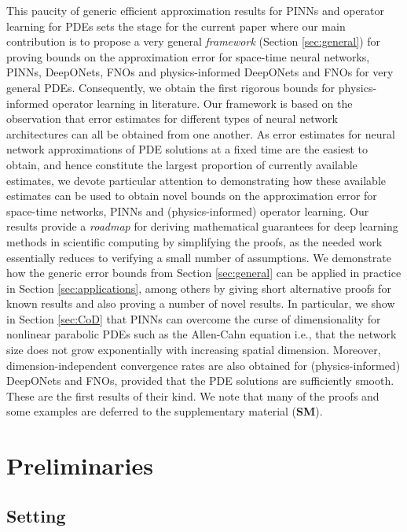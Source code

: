 \documentclass{article}
\numberwithin{equation}{section}
\newcommand{\1}{\mathbbm{1}}
\begin{document}
This paucity of generic efficient approximation results for PINNs and operator learning for PDEs sets the stage for the current paper where our main contribution is to propose a very general \emph{framework} (Section \ref{sec:general}) for proving bounds on the approximation error for space-time neural networks, PINNs, DeepONets, FNOs and physics-informed DeepONets and FNOs for very general PDEs. Consequently, we obtain the first rigorous bounds for physics-informed operator learning in literature. 
Our framework is based on the observation that error estimates for different types of neural network architectures can all be obtained from one another. As error estimates for neural network approximations of PDE solutions at a fixed time are the easiest to obtain, and hence constitute the largest proportion of currently available estimates, we devote particular attention to demonstrating how these available estimates can be used to obtain novel bounds on the approximation error for space-time networks, PINNs and (physics-informed) operator learning. 
Our results provide a \emph{roadmap} for deriving mathematical guarantees for deep learning methods in scientific computing by simplifying the proofs, as the needed work essentially reduces to verifying a small number of assumptions. We demonstrate how the generic error bounds from Section \ref{sec:general} can be applied in practice in Section \ref{sec:applications}, among others by giving short alternative proofs for known results and also proving a number of novel results. In particular, we show in Section \ref{sec:CoD} that PINNs can overcome the curse of dimensionality for nonlinear parabolic PDEs such as the Allen-Cahn equation i.e., that the network size does not grow exponentially with increasing spatial dimension. Moreover, dimension-independent convergence rates are also obtained for (physics-informed) DeepONets and FNOs, provided that the PDE solutions are sufficiently smooth. These are the first results of their kind. We note that many of the proofs and some examples are deferred to the supplementary material (\textbf{SM}). 
\section{Preliminaries}\label{sec:preliminaries}

\subsection{Setting}\label{sec:setting}
\end{document}
